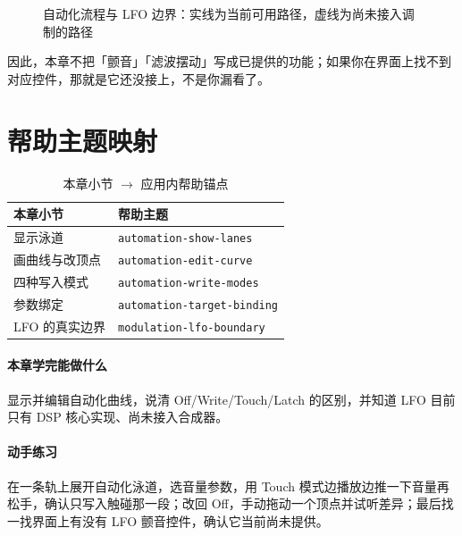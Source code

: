\begin{figure}[htbp]
\centering
{}
\caption{自动化流程与 LFO 边界：实线为当前可用路径，虚线为尚未接入调制的路径}
\label{fig:ch06-automation-flow}
\end{figure}

因此，本章不把「颤音」「滤波摆动」写成已提供的功能；如果你在界面上找不到
对应控件，那就是它还没接上，不是你漏看了。

\section{帮助主题映射}

\begin{table}[htbp]
\centering
\caption{本章小节 $\to$ 应用内帮助锚点}
\label{tab:ch06-help}
\begin{tabular}{ll}
\hline
本章小节 & 帮助主题 \\
\hline
显示泳道 & \texttt{automation-show-lanes} \\
画曲线与改顶点 & \texttt{automation-edit-curve} \\
四种写入模式 & \texttt{automation-write-modes} \\
参数绑定 & \texttt{automation-target-binding} \\
LFO 的真实边界 & \texttt{modulation-lfo-boundary} \\
\hline
\end{tabular}
\end{table}

\paragraph{本章学完能做什么} 显示并编辑自动化曲线，说清 Off/Write/Touch/Latch 的区别，并知道 LFO 目前只有 DSP 核心实现、尚未接入合成器。

\paragraph{动手练习} 在一条轨上展开自动化泳道，选音量参数，用 Touch 模式边播放边推一下音量再松手，确认只写入触碰那一段；改回 Off，手动拖动一个顶点并试听差异；最后找一找界面上有没有 LFO 颤音控件，确认它当前尚未提供。
